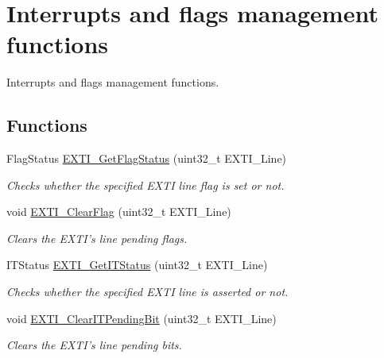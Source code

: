 \hypertarget{group___e_x_t_i___group2}{}\section{Interrupts and flags management functions}
\label{group___e_x_t_i___group2}


Interrupts and flags management functions.  


\subsection*{Functions}
\begin{DoxyCompactItemize}
\item 
Flag\+Status \hyperlink{group___e_x_t_i___group2_ga0ce06e6b312592df149800d63218cffa}{E\+X\+T\+I\+\_\+\+Get\+Flag\+Status} (uint32\+\_\+t E\+X\+T\+I\+\_\+\+Line)
\begin{DoxyCompactList}\small\item\em Checks whether the specified E\+X\+T\+I line flag is set or not. \end{DoxyCompactList}\item 
void \hyperlink{group___e_x_t_i___group2_ga8e07aaaa286dea4803605d5968850a92}{E\+X\+T\+I\+\_\+\+Clear\+Flag} (uint32\+\_\+t E\+X\+T\+I\+\_\+\+Line)
\begin{DoxyCompactList}\small\item\em Clears the E\+X\+T\+I's line pending flags. \end{DoxyCompactList}\item 
I\+T\+Status \hyperlink{group___e_x_t_i___group2_gaf7b51519062ae42fd27ee689cab364aa}{E\+X\+T\+I\+\_\+\+Get\+I\+T\+Status} (uint32\+\_\+t E\+X\+T\+I\+\_\+\+Line)
\begin{DoxyCompactList}\small\item\em Checks whether the specified E\+X\+T\+I line is asserted or not. \end{DoxyCompactList}\item 
void \hyperlink{group___e_x_t_i___group2_ga3652a7e682728b310c124e7e974d1468}{E\+X\+T\+I\+\_\+\+Clear\+I\+T\+Pending\+Bit} (uint32\+\_\+t E\+X\+T\+I\+\_\+\+Line)
\begin{DoxyCompactList}\small\item\em Clears the E\+X\+T\+I's line pending bits. \end{DoxyCompactList}\end{DoxyCompactItemize}


